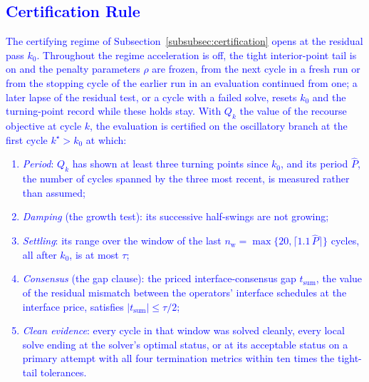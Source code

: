 \subsection{\textcolor{blue}{Certification Rule}}
\label{app:admm_updated_certification}

\textcolor{blue}{
    The certifying regime of Subsection~\ref{subsubsec:certification} opens at the residual pass $k_0$. Throughout the regime acceleration is off, the tight interior-point tail is on and the penalty parameters $\rho$ are frozen, from the next cycle in a fresh run or from the stopping cycle of the earlier run in an evaluation continued from one; a later lapse of the residual test, or a cycle with a failed solve, resets $k_0$ and the turning-point record while these holds stay. With $Q_k$ the value of the recourse objective at cycle $k$, the evaluation is certified on the oscillatory branch at the first cycle $k^{\star} > k_0$ at which:
}

\textcolor{blue}{
    \begin{enumerate}
        \item[(C1)] \emph{Period}: $Q_k$ has shown at least three turning points since $k_0$, and its period $\hat{P}$, the number of cycles spanned by the three most recent, is measured rather than assumed;
        \item[(C2)] \emph{Damping} (the growth test): its successive half-swings are not growing;
        \item[(C3)] \emph{Settling}: its range over the window of the last $n_{\mathrm{w}} = \max\{20, \lceil 1.1\,\hat{P} \rceil\}$ cycles, all after $k_0$, is at most $\tau$;
        \item[(C4)] \emph{Consensus} (the gap clause): the priced interface-consensus gap $t_{\text{sum}}$, the value of the residual mismatch between the operators' interface schedules at the interface price, satisfies $|t_{\text{sum}}| \le \tau/2$;
        \item[(C5)] \emph{Clean evidence}: every cycle in that window was solved cleanly, every local solve ending at the solver's optimal status, or at its acceptable status on a primary attempt with all four termination metrics within ten times the tight-tail tolerances.
    \end{enumerate}
}

